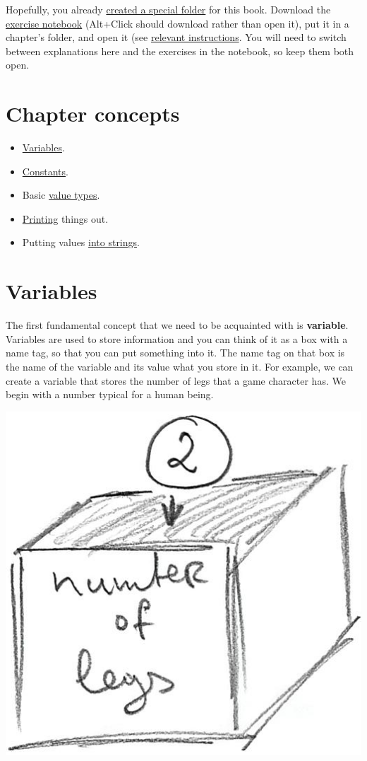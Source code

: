 \documentclass[
]{book}
\providecommand{\tightlist}{%
  \setlength{\itemsep}{0pt}\setlength{\parskip}{0pt}}
\begin{document}
Hopefully, you already \protect\hyperlink{files-folder}{created a special folder} for this book. Download the \href{notebooks/Seminar\%2001.\%20Basics.ipynb}{exercise notebook} (Alt+Click should download rather than open it), put it in a chapter's folder, and open it (see \protect\hyperlink{jupyter-notebooks}{relevant instructions}. You will need to switch between explanations here and the exercises in the notebook, so keep them both open.

\hypertarget{chapter-concepts}{%
\section{Chapter concepts}\label{chapter-concepts}}

\begin{itemize}
\tightlist
\item
  \protect\hyperlink{variables}{Variables}.
\item
  \protect\hyperlink{constants}{Constants}.
\item
  Basic \protect\hyperlink{value-types}{value types}.
\item
  \protect\hyperlink{print}{Printing} things out.
\item
  Putting values \protect\hyperlink{string-formatting}{into strings}.
\end{itemize}

\hypertarget{variables}{%
\section{Variables}\label{variables}}

The first fundamental concept that we need to be acquainted with is \textbf{variable}. Variables are used to store information and you can think of it as a box with a name tag, so that you can put something into it. The name tag on that box is the name of the variable and its value what you store in it. For example, we can create a variable that stores the number of legs that a game character has. We begin with a number typical for a human being.

\begin{center}\includegraphics[width=0.5\linewidth]{images/variable-as-box} \end{center}
\end{document}
